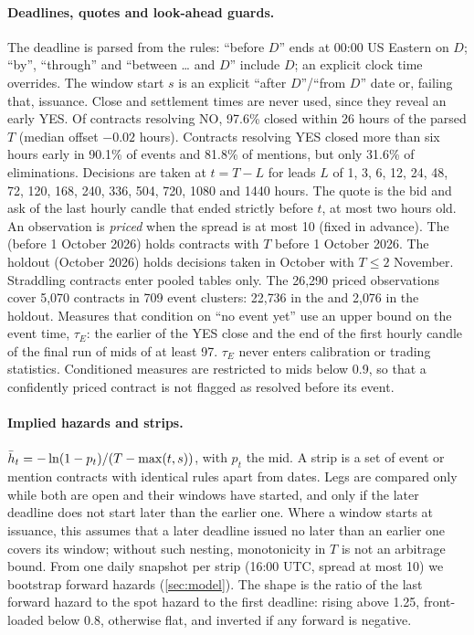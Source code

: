 \paragraph{Deadlines, quotes and look-ahead guards.}
The deadline is parsed from the rules: ``before $D$'' ends at 00:00 US Eastern on $D$; ``by'',
``through'' and ``between \dots{} and $D$'' include $D$; an explicit clock time overrides. The window
start $s$ is an explicit ``after $D$''/``from $D$'' date or, failing that, issuance. Close and
settlement times are never used, since they reveal an early YES. Of contracts resolving NO, 97.6\%
closed within 26 hours of the parsed $T$ (median offset $-0.02$ hours). Contracts resolving YES
closed more than six hours early in 90.1\% of events and 81.8\% of mentions, but only 31.6\% of
eliminations.
Decisions are taken at $t=T-L$ for leads $L$ of 1, 3, 6, 12, 24, 48, 72, 120, 168, 240, 336, 504,
720, 1080 and 1440 hours. The quote is the bid and ask of the last hourly candle that ended strictly before $t$, at most
two hours old. An observation is \emph{priced} when the spread is at most 10\cents{} (fixed in
advance). The \estim{} (before 1 October 2026) holds contracts with $T$ before 1 October 2026. The
holdout (October 2026) holds decisions taken in October with $T\le 2$ November. Straddling contracts
enter pooled tables only. The 26{,}290 priced observations cover 5{,}070 contracts in 709 event
clusters: 22{,}736 in the \estim{} and 2{,}076 in the holdout.
Measures that condition on ``no event yet'' use an upper bound on the event time, $\tau_E$: the
earlier of the YES close and the end of the first hourly candle of the final run of mids of at least
97\cents. $\tau_E$ never enters calibration or trading statistics. Conditioned measures are
restricted to mids below 0.9, so that a confidently priced contract is not flagged as resolved before
its event.

\paragraph{Implied hazards and strips.}
$\bar h_t=-\ln(1-p_t)/(T-\max(t,s))$, with $p_t$ the mid. A strip is a set of event or mention
contracts with identical rules apart from dates. Legs are compared only while both are open and
their windows have started, and only if the later deadline does not start later than the earlier one.
Where a window starts at issuance, this assumes that a later deadline issued no later than an earlier
one covers its window; without such nesting, monotonicity in $T$ is not an arbitrage bound. From one
daily snapshot per strip (16:00 UTC, spread at most 10\cents) we bootstrap forward hazards
(\cref{sec:model}). The shape is the ratio of the last forward hazard to the spot hazard to the first
deadline: rising above 1.25, front-loaded below 0.8, otherwise flat, and inverted if any forward is
negative.

